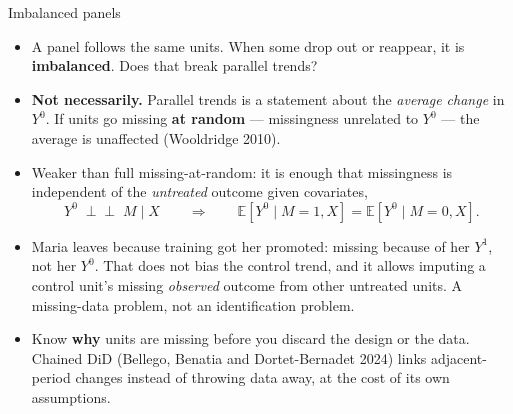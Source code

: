 \documentclass[
  11pt,
  ignorenonframetext,
  aspectratio=169,
]{beamer}
\providecommand{\tightlist}{%
  \setlength{\itemsep}{0pt}\setlength{\parskip}{0pt}}
\newcommand{\indep}{\perp\!\!\!\perp}
\begin{document}
\begin{frame}{Imbalanced panels}
\protect{}\label{imbalanced-panels}
\begin{itemize}
\tightlist
\item
  A panel follows the same units. When some drop out or reappear, it is
  \textbf{imbalanced}. Does that break parallel trends?
\item
  \textbf{Not necessarily.} Parallel trends is a statement about the
  \emph{average change} in \(Y^0\). If units go missing \textbf{at
  random} --- missingness unrelated to \(Y^0\) --- the average is
  unaffected (Wooldridge 2010).
\item
  Weaker than full missing-at-random: it is enough that missingness is
  independent of the \emph{untreated} outcome given covariates, \[
  Y^0 \;\indep\; M \mid X \qquad\Longrightarrow\qquad \mathbb{E}[Y^0 \mid M=1, X] = \mathbb{E}[Y^0 \mid M=0, X].
  \]
\item
  Maria leaves because training got her promoted: missing because of her
  \(Y^1\), not her \(Y^0\). That does not bias the control trend, and it
  allows imputing a control unit's missing \emph{observed} outcome from
  other untreated units. A missing-data problem, not an identification
  problem.
\item
  Know \textbf{why} units are missing before you discard the design or
  the data. Chained DiD (Bellego, Benatia and Dortet-Bernadet 2024)
  links adjacent-period changes instead of throwing data away, at the
  cost of its own assumptions.
\end{itemize}
\end{frame}
\end{document}
